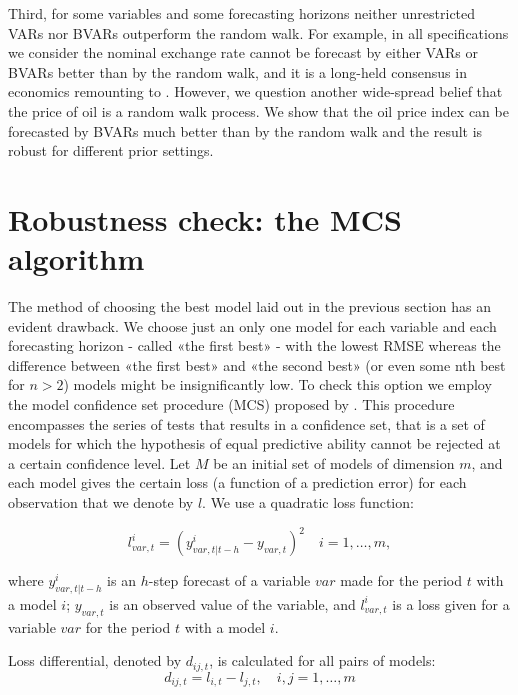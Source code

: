 \documentclass[11pt]{article} %
\begin{document}
Third, for some variables and some forecasting horizons neither unrestricted VARs nor BVARs outperform  the random walk. For example, in all specifications we consider the nominal exchange rate cannot be forecast by either VARs or BVARs better than by the random walk, and it is a long-held consensus in economics remounting to \cite{meese_rogoff_1983}. However, we question another wide-spread belief that the price of oil is a random walk process. We show that the oil price index can be forecasted by BVARs much better than by the random walk and the result is robust for different prior settings.

\section{Robustness check: the MCS algorithm}


The method of choosing the best model laid out in the previous section has an evident drawback. We choose just an only one model for each variable and each forecasting horizon - called «the first best» - with the lowest RMSE whereas the difference between «the first best» and «the second best» (or even some nth best for $n>2$) models might be insignificantly low. To check this option we employ the model confidence set procedure (MCS) proposed by \cite{hansen_al_2011}.
This procedure encompasses the series of tests that results in a confidence set, that is a set of models for which the hypothesis of equal predictive ability cannot be rejected at a certain confidence level.
Let $M$ be an initial set of models of dimension $m$, and each model gives the certain loss (a function of a prediction error) for each observation that we denote by $l$. We use a quadratic loss function:

\begin{equation}
l_{var,t}^i=(y_{var,t|t-h}^{i}-y_{var,t})^2\quad i=1,\ldots,m,
\end{equation}

where $y_{var,t|t-h}^{i}$ is an $h$-step forecast of a variable $var$ made for the period $t$ with a model $i$;  $y_{var,t}$ is an observed value of the variable, and $l^i_{var,t}$ is a loss given for a variable $var$ for the period $t$ with a model $i$.

Loss differential, denoted by $d_{ij,t}$, is calculated for all pairs of models:
\begin{equation}
d_{ij,t}=l_{i,t}-l_{j,t},\quad i,j=1,\ldots, m
\end{equation}
\end{document}
